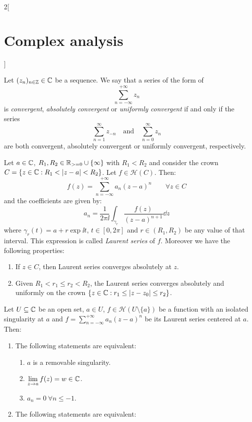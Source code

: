 \documentclass[../../../main.tex]{subfiles}
\begin{document}
\begin{multicols}{2}[\section{Complex analysis}]
\begin{definition}
  \end{definition}
  \begin{definition}
    Let $(z_n)_{n\in\mathbb{Z}}\in\mathbb{C}$ be a sequence. We say that a series of the form of $$\sum_{n=-\infty}^{+\infty} z_n$$ is \emph{convergent}, \emph{absolutely convergent} or \emph{uniformly convergent} if and only if the series $$\sum_{n=1}^{\infty}z_{-n}\quad\text{and}\quad\sum_{n=0}^\infty z_n$$ are both convergent, absolutely convergent or uniformly convergent, respectively.
  \end{definition}
  \begin{theorem}
    Let $a\in\mathbb{C}$, $R_1,R_2\in\mathbb{R}_{>=0}\cup\{\infty\}$ with $R_1<R_2$ and consider the crown $C=\{z\in\mathbb{C}:R_1<\abs{z-a}<R_2\}$. Let $f\in\mathcal{H}(C)$. Then: $$f(z)=\sum_{n=-\infty}^{+\infty} a_n{(z-a)}^n\qquad\forall z\in C$$ and the coefficients are given by: $$a_n=\frac{1}{2\pi\ii}\int_{\gamma_r}\frac{f(z)}{{(z-a)}^{n+1}}\dd{z}$$ where $\gamma_r(t)=a+r\exp{\ii t}$, $t\in[0,2\pi]$ and $r\in(R_1,R_2)$ be any value of that interval. This expression is called \emph{Laurent series} of $f$. Moreover we have the following properties:
    \begin{enumerate}
      \item If $z\in C$, then Laurent series converges absolutely at $z$.
      \item Given $R_1<r_1\leq r_2<R_2$, the Laurent series converges absolutely and uniformly on the crown $\{z\in\mathbb{C}:r_1\leq\abs{z-z_0}\leq r_2\}$.
    \end{enumerate}
  \end{theorem}
  \begin{corollary}
    Let $U\subseteq \mathbb{C}$ be an open set, $a\in U$, $f\in\mathcal{H}(U\setminus\{a\})$ be a function with an isolated singularity at $a$ and $f=\sum_{n=-\infty}^{+\infty} a_n{(z-a)}^n$ be its Laurent series centered at $a$. Then:
    \begin{enumerate}
      \item The following statements are equivalent:
            \begin{enumerate}
              \item $a$ is a removable singularity.
              \item $\displaystyle\lim_{z\to a} f(z)= w\in\mathbb{C}$.
              \item $a_n=0\ \forall n\leq -1$.
            \end{enumerate}
      \item  The following statements are equivalent:

\end{enumerate}
\end{corollary}
\end{multicols}
\end{document}

